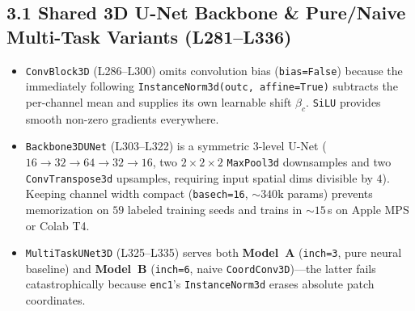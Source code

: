 \documentclass[10pt,a4paper]{article}
\renewcommand{\_}{\origunderscore\allowbreak}
\begin{document}
\subsection*{3.1 Shared 3D U-Net Backbone \& Pure/Naive Multi-Task Variants (L281--L336)}
\begin{annotbox}
\begin{itemize}
    \item \texttt{ConvBlock3D} (L286--L300) omits convolution bias (\texttt{bias=False}) because the immediately following \texttt{InstanceNorm3d(out\_c, affine=True)} subtracts the per-channel mean and supplies its own learnable shift $\beta_c$. \texttt{SiLU} provides smooth non-zero gradients everywhere.
    \item \texttt{Backbone3DUNet} (L303--L322) is a symmetric 3-level U-Net ($16 \to 32 \to 64 \to 32 \to 16$, two $2{\times}2{\times}2$ \texttt{MaxPool3d} downsamples and two \texttt{ConvTranspose3d} upsamples, requiring input spatial dims divisible by $4$). Keeping channel width compact (\texttt{base\_ch=16}, $\sim 340\text{k}$ params) prevents memorization on $59$ labeled training seeds and trains in $\sim 15$\,s on Apple MPS or Colab T4.
    \item \texttt{MultiTaskUNet3D} (L325--L335) serves both \textbf{Model~A} (\texttt{in\_ch=3}, pure neural baseline) and \textbf{Model~B} (\texttt{in\_ch=6}, naive \texttt{CoordConv3D})---the latter fails catastrophically because \texttt{enc1}'s \texttt{InstanceNorm3d} erases absolute patch coordinates.
\end{itemize}
\end{annotbox}
\end{document}

